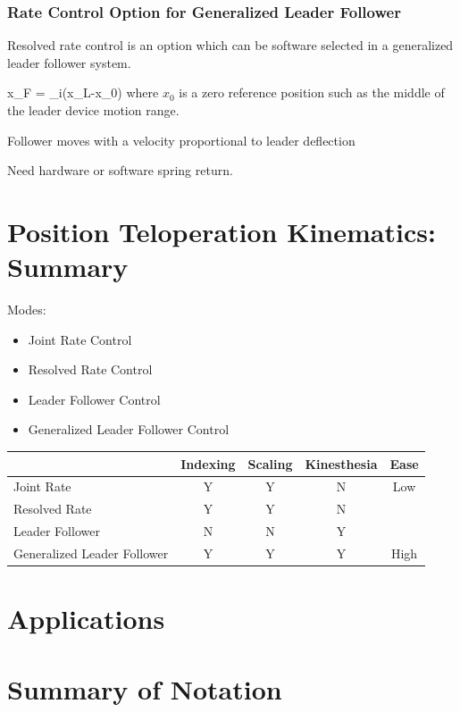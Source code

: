 \subsubsection{Rate Control Option for Generalized Leader Follower}


Resolved rate control is an option which can be software selected in a generalized leader follower system.	%

\bq
\Delta x_F = \alpha_i(x_L-x_0)
\eq
where $x_0$ is a zero reference position such as the middle of the leader device motion range.	%

Follower moves with a velocity proportional to leader deflection

Need hardware or software spring return.


\section{Position Teloperation Kinematics: Summary}

Modes:

\begin{itemize}
	\item Joint Rate Control
	\item Resolved Rate Control
	\item Leader Follower Control
	\item Generalized Leader Follower Control
\end{itemize}


\begin{tabular}{l|cccc}
                & Indexing         & Scaling        & Kinesthesia      & Ease   \\ \hline
Joint Rate      &    Y             &   Y            &    N             &  Low     \\
Resolved Rate   &    Y             &   Y            &    N             &        \\
Leader Follower    &    N             &   N            &    Y             &        \\
Generalized Leader Follower
                &    Y             &   Y            &    Y             & High  \\ \hline
\end{tabular}






\section{Applications}


\section{Summary of Notation}



